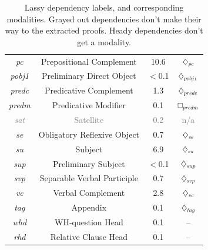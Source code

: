 \begin{table}
\begin{tabularx}{0.925\textwidth}{@{}cccc@{}}
	      \textit{pc} & Prepositional Complement &10.6& $\ddia{pc}$\\      
	      \textit{pobj1} & Preliminary Direct Object &$<$0.1& $\ddia{pobj1}$\\      
	      \textit{predc} & Predicative Complement &1.3& $\ddia{predc}$\\      
	      \textit{predm} & Predicative Modifier &0.1& $\dbox{predm}$\\      
	      \textcolor{gray}{\textit{sat}} & \textcolor{gray}{Satellite} & \textcolor{gray}{0.2} & \textcolor{gray}{{\small n/a}}\\
	      \textit{se} & Obligatory Reflexive Object &0.7& $\ddia{se}$\\      
	      \textit{su} & Subject &6.9& $\ddia{su}$\\
	      \textit{sup} & Preliminary Subject &$<$0.1& $\ddia{sup}$\\
	      \textit{svp} & Separable Verbal Participle &0.7& $\ddia{svp}$\\   
	      \textit{vc} & Verbal Complement &2.8& $\ddia{vc}$\\
	      \textit{tag} & Appendix &0.1& $\ddia{tag}$\\
	      \textit{whd} & WH-question Head &0.1 & --\\
	      \textit{rhd} & Relative Clause Head & 0.1 & --\\
	\end{tabularx}
	\caption{Lassy dependency labels, and corresponding modalities.
	Grayed out dependencies don't make their way to the extracted proofs.
	Heady dependencies don't get a modality.
	}
	\label{table:depset}
\end{table}

